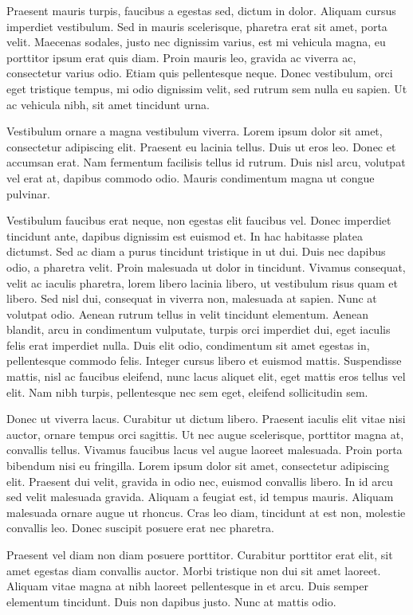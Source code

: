 Praesent mauris turpis, faucibus a egestas sed, dictum in dolor. Aliquam cursus imperdiet vestibulum. Sed in mauris scelerisque, pharetra erat sit amet, porta velit. Maecenas sodales, justo nec dignissim varius, est mi vehicula magna, eu porttitor ipsum erat quis diam. Proin mauris leo, gravida ac viverra ac, consectetur varius odio. Etiam quis pellentesque neque. Donec vestibulum, orci eget tristique tempus, mi odio dignissim velit, sed rutrum sem nulla eu sapien. Ut ac vehicula nibh, sit amet tincidunt urna.

Vestibulum ornare a magna vestibulum viverra. Lorem ipsum dolor sit amet, consectetur adipiscing elit. Praesent eu lacinia tellus. Duis ut eros leo. Donec et accumsan erat. Nam fermentum facilisis tellus id rutrum. Duis nisl arcu, volutpat vel erat at, dapibus commodo odio. Mauris condimentum magna ut congue pulvinar.

Vestibulum faucibus erat neque, non egestas elit faucibus vel. Donec imperdiet tincidunt ante, dapibus dignissim est euismod et. In hac habitasse platea dictumst. Sed ac diam a purus tincidunt tristique in ut dui. Duis nec dapibus odio, a pharetra velit. Proin malesuada ut dolor in tincidunt. Vivamus consequat, velit ac iaculis pharetra, lorem libero lacinia libero, ut vestibulum risus quam et libero. Sed nisl dui, consequat in viverra non, malesuada at sapien. Nunc at volutpat odio. Aenean rutrum tellus in velit tincidunt elementum. Aenean blandit, arcu in condimentum vulputate, turpis orci imperdiet dui, eget iaculis felis erat imperdiet nulla. Duis elit odio, condimentum sit amet egestas in, pellentesque commodo felis. Integer cursus libero et euismod mattis. Suspendisse mattis, nisl ac faucibus eleifend, nunc lacus aliquet elit, eget mattis eros tellus vel elit. Nam nibh turpis, pellentesque nec sem eget, eleifend sollicitudin sem.

Donec ut viverra lacus. Curabitur ut dictum libero. Praesent iaculis elit vitae nisi auctor, ornare tempus orci sagittis. Ut nec augue scelerisque, porttitor magna at, convallis tellus. Vivamus faucibus lacus vel augue laoreet malesuada. Proin porta bibendum nisi eu fringilla. Lorem ipsum dolor sit amet, consectetur adipiscing elit. Praesent dui velit, gravida in odio nec, euismod convallis libero. In id arcu sed velit malesuada gravida. Aliquam a feugiat est, id tempus mauris. Aliquam malesuada ornare augue ut rhoncus. Cras leo diam, tincidunt at est non, molestie convallis leo. Donec suscipit posuere erat nec pharetra.

Praesent vel diam non diam posuere porttitor. Curabitur porttitor erat elit, sit amet egestas diam convallis auctor. Morbi tristique non dui sit amet laoreet. Aliquam vitae magna at nibh laoreet pellentesque in et arcu. Duis semper elementum tincidunt. Duis non dapibus justo. Nunc at mattis odio.

